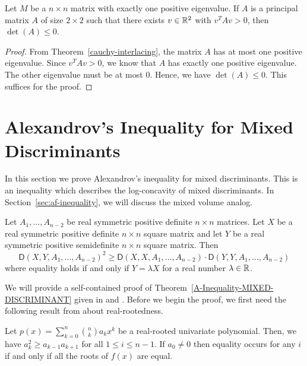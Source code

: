 \documentclass{puthesis-UG}
\begin{document}
\begin{cor}
	Let $M$ be a $n \times n$ matrix with exactly one positive eigenvalue. If $A$ is a principal matrix $A$ of size $2 \times 2$ such that there exists $v \in \mathbb{R}^2$ with $v^T A v > 0$, then $\det (A) \leq 0$. 
\end{cor}

\begin{proof}
	From Theorem~\ref{cauchy-interlacing}, the matrix $A$ has at most one positive eigenvalue. Since $v^T A v > 0$, we know that $A$ has exactly one positive eigenvalue. The other eigenvalue must be at most $0$. Hence, we have $\det (A) \leq 0$. This suffices for the proof. 
\end{proof}

\section{Alexandrov's Inequality for Mixed Discriminants} \label{sec:a-inequality}

In this section we prove Alexandrov's inequality for mixed discriminants. This is an inequality which describes the log-concavity of mixed discriminants. In Section~\ref{sec:af-inequality}, we will discuss the mixed volume analog. 

\begin{thm}  \label{A-Inequality-MIXED-DISCRIMINANT}
	Let $A_1, \ldots, A_{n-2}$ be real symmetric positive definite $n \times n$ matrices. Let $X$ be a real symmetric positive definite $n \times n$ square matrix and let $Y$ be a real symmetric positive semidefinite $n \times n$ square matrix. Then 
	\[
		\mathsf{D}(X, Y, A_1, \ldots, A_{n-2})^2 \geq \mathsf{D}(X, X, A_1, \ldots, A_{n-2}) \cdot \mathsf{D} (Y, Y, A_1, \ldots, A_{n-2})
	\]
	where equality holds if and only if $Y = \lambda X$ for a real number $\lambda \in \mathbb{R}$. 
\end{thm}

We will provide a self-contained proof of Theorem~\ref{A-Inequality-MIXED-DISCRIMINANT} given in \cite{bapat_raghavan_1997} and \cite{schneider-mixed-discriminants}.  Before we begin the proof, we first need the following result from \cite{hardy1952inequalities} about real-rootedness. 

\begin{lem}  \label{newton}
	Let $p(x) = \sum_{k = 0}^n \binom{n}{k} a_k x^k$ be a real-rooted univariate polynomial. Then, we have $a_k^2 \geq a_{k-1}a_{k+1}$ for all $1 \leq i \leq n-1$. If $a_0 \neq 0$ then equality occurs for any $i$ if and only if all the roots of $f(x)$ are equal. 
\end{lem}
\end{document}
